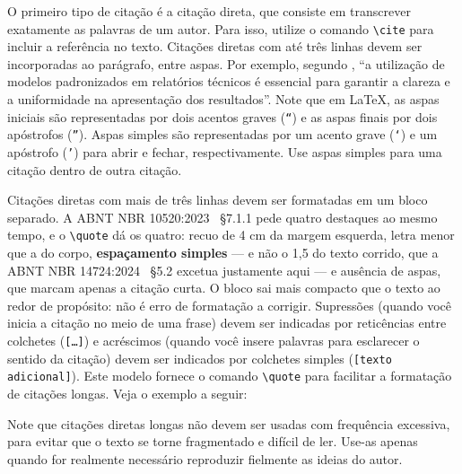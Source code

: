 O primeiro tipo de citação é a citação direta, que consiste em transcrever exatamente as palavras de
um autor. Para isso, utilize o comando \texttt{\textbackslash cite} para incluir a referência no
texto. Citações diretas com até três linhas devem ser incorporadas ao parágrafo, entre aspas. Por
exemplo, segundo \textcite{fernandes2019}, ``a utilização de modelos padronizados em relatórios
técnicos é essencial para garantir a clareza e a uniformidade na apresentação dos resultados''. Note
que em \LaTeX, as aspas iniciais são representadas por dois acentos graves (\texttt{``}) e as aspas
finais por dois apóstrofos (\texttt{''}). Aspas simples são representadas por um acento grave
(\texttt{`}) e um apóstrofo (\texttt{'}) para abrir e fechar, respectivamente. Use aspas simples
para uma citação dentro de outra citação.

Citações diretas com mais de três linhas devem ser formatadas em um bloco separado. A ABNT NBR
10520:2023~\cite{nbr10520:2023} §7.1.1 pede quatro destaques ao mesmo tempo, e o \verb|\quote| dá os
quatro: recuo de 4 cm da margem esquerda, letra menor que a do corpo, \textbf{espaçamento simples}
--- e não o 1,5 do texto corrido, que a ABNT NBR 14724:2024~\cite{nbr14724:2024} §5.2 excetua
justamente aqui --- e ausência de aspas, que marcam apenas a citação curta. O bloco sai mais
compacto que o texto ao redor de propósito: não é erro de formatação a corrigir.
Supressões (quando você inicia a citação no meio de uma frase) devem ser indicadas por reticências entre colchetes
(\texttt{[\ldots]}) e acréscimos (quando você insere palavras para esclarecer o sentido da citação)
devem ser indicados por colchetes simples (\texttt{[texto adicional]}). Este modelo fornece o
comando \texttt{\textbackslash quote{}{}} para facilitar a formatação de citações longas. Veja o exemplo
a seguir:


Note que citações diretas longas não devem ser usadas com frequência excessiva, para evitar que o
texto se torne fragmentado e difícil de ler. Use-as apenas quando for realmente necessário
reproduzir fielmente as ideias do autor.

